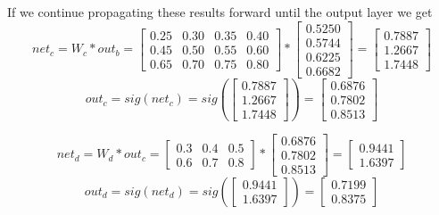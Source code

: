 \documentclass[11pt, halfparskip]{article}
\begin{document}
        \newpage
        \noindent If we continue propagating these results forward until the output layer we get
        \[
        	net_c = W_c * out_b = 
        	\begin{bmatrix}
        		0.25 & 0.30 & 0.35 & 0.40\\
            	0.45 & 0.50 & 0.55 & 0.60\\
            	0.65 & 0.70 & 0.75 & 0.80
        	\end{bmatrix}
        	*
        	\begin{bmatrix}
        		0.5250\\
        		0.5744\\
        		0.6225\\
        		0.6682
        	\end{bmatrix}
        	=
        	\begin{bmatrix}
        		0.7887\\
        		1.2667\\
        		1.7448
        	\end{bmatrix}
        \]
        \[
        	out_c = sig(net_c) = sig(
        	   \begin{bmatrix}
        	   	0.7887\\
        		1.2667\\
        		1.7448
        	   \end{bmatrix}
        	) = 
        	\begin{bmatrix}
        		0.6876\\
        		0.7802\\
        		0.8513
        	\end{bmatrix}
        \]
        
        \[
        	net_d = W_d * out_c = 
        	\begin{bmatrix}
        		0.3 & 0.4 & 0.5\\
            	0.6 & 0.7 & 0.8
        	\end{bmatrix}
        	*
        	\begin{bmatrix}
        		0.6876\\
        		0.7802\\
        		0.8513
        	\end{bmatrix}
        	        =
        	\begin{bmatrix}
        		0.9441\\
        		1.6397
        	\end{bmatrix}
        \]
        \[
        	out_d = sig(net_d) = sig(
        	\begin{bmatrix}
        		0.9441\\
        		1.6397
        	\end{bmatrix}
        	) = 
        	\begin{bmatrix}
        		0.7199\\
        		0.8375
        	\end{bmatrix}
        \]
\end{document}
